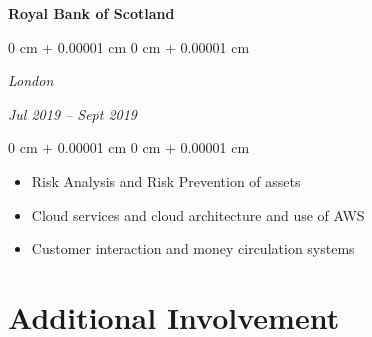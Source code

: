 \documentclass[10pt, letterpaper]{article}
\newenvironment{onecolentry}{
    \begin{adjustwidth}{
        0 cm + 0.00001 cm
    }{
        0 cm + 0.00001 cm
    }
}{
    \end{adjustwidth}
} %
\newenvironment{twocolentry}[2][]{
    \onecolentry
    \def\secondColumn{#2}
    \setcolumnwidth{\fill, 4.5 cm}
    \begin{paracol}{2}
}{
    \switchcolumn \raggedleft \secondColumn
    \end{paracol}
    \endonecolentry
} %
\begin{document}
        \vspace{0.10cm}
        
         \textbf{Royal Bank of Scotland}


        \vspace{0.10 cm}

         \begin{twocolentry}{
            
            
        \textit{Jul 2019 – Sept 2019}}

            \textit{London}
        \end{twocolentry}

        \begin{onecolentry}
            \begin{itemize}
                \item Risk Analysis and Risk Prevention of assets
                \item Cloud services and cloud architecture and use of AWS
                \item Customer interaction and money circulation systems
            \end{itemize}
               
        \end{onecolentry}


        \vspace{0.2 cm}



    
     \section{Additional Involvement}
\end{document}
